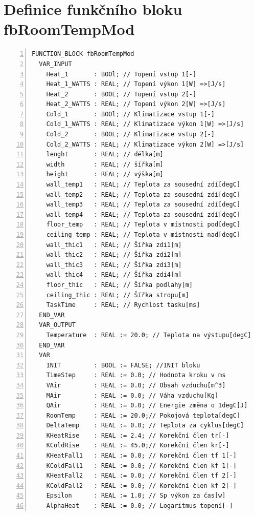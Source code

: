 \chapter{Definice funkčního bloku fbRoomTempMod}
\label{apend:fbRoomTempMod}
\begin{lstlisting}[language=ST, breaklines=true, numbers=left, numberstyle=\small, numbersep=10pt, frame=single, basicstyle=\ttfamily\small, caption={Definice funkčního bloku fbRoomTempMod}, label={lst:fbRoomTempMod}]
FUNCTION_BLOCK fbRoomTempMod
  VAR_INPUT
    Heat_1       : BOOl; // Topení vstup 1[-]
    Heat_1_WATTS : REAL; // Topení výkon 1[W] =>[J/s]
    Heat_2       : BOOL; // Topení vstup 2[-]
    Heat_2_WATTS : REAL; // Topení výkon 2[W] =>[J/s]
    Cold_1       : BOOl; // Klimatizace vstup 1[-]
    Cold_1_WATTS : REAL; // Klimatizace výkon 1[W] =>[J/s]
    Cold_2       : BOOL; // Klimatizace vstup 2[-]
    Cold_2_WATTS : REAL; // Klimatizace výkon 2[W] =>[J/s]
    lenght       : REAL; // délka[m]
    width        : REAL; // šířka[m]
    height       : REAL; // výška[m]
    wall_temp1   : REAL; // Teplota za sousední zdí[degC]
    wall_temp2   : REAL; // Teplota za sousední zdí[degC]
    wall_temp3   : REAL; // Teplota za sousední zdí[degC]
    wall_temp4   : REAL; // Teplota za sousední zdí[degC]
    floor_temp   : REAL; // Teplota v místnosti pod[degC]
    ceiling_temp : REAL; // Teplota v místnosti nad[degC]
    wall_thic1   : REAL; // Šířka zdi1[m]
    wall_thic2   : REAL; // Šířka zdi2[m]
    wall_thic3   : REAL; // Šířka zdi3[m]
    wall_thic4   : REAL; // Šířka zdi4[m]
    floor_thic   : REAL; // Šířka podlahy[m]
    ceiling_thic : REAL; // Šířka stropu[m]
    TaskTime     : REAL; // Rychlost tasku[ms]
  END_VAR
  VAR_OUTPUT
    Temperature  : REAL := 20.0; // Teplota na výstupu[degC]
  END_VAR
  VAR
    INIT         : BOOL := FALSE; //INIT bloku
    TimeStep     : REAL := 0.0; // Hodnota kroku v ms
    VAir         : REAL := 0.0; // Obsah vzduchu[m^3]
    MAir         : REAL := 0.0; // Váha vzduchu[Kg]
    QAir         : REAL := 0.0; // Energie změna o 1degC[J]
    RoomTemp     : REAL := 20.0;// Pokojová teplota[degC]
    DeltaTemp    : REAL := 0.0; // Teplota za cyklus[degC]
    KHeatRise    : REAL := 2.4; // Korekční člen tr[-]
    KColdRise    : REAL := 45.0;// Korekční člen kr[-]
    KHeatFall1   : REAL := 0.0; // Korekční člen tf 1[-]
    KColdFall1   : REAL := 0.0; // Korekční člen kf 1[-]
    KHeatFall2   : REAL := 0.0; // Korekční člen tf 2[-]
    KColdFall2   : REAL := 0.0; // Korekční člen kf 2[-]
    Epsilon      : REAL := 1.0; // Sp výkon za čas[w]
    AlphaHeat    : REAL := 0.0; // Logaritmus topení[-]

\end{lstlisting}
